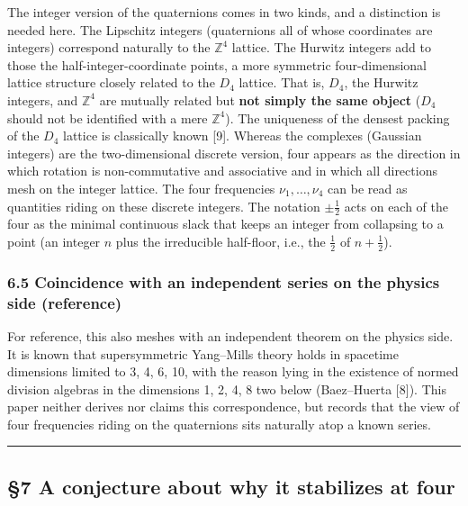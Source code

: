 \documentclass[
]{article}
\begin{document}
The integer version of the quaternions comes in two kinds, and a
distinction is needed here. The Lipschitz integers (quaternions all of
whose coordinates are integers) correspond naturally to the
\(\mathbb{Z}^4\) lattice. The Hurwitz integers add to those the
half-integer-coordinate points, a more symmetric four-dimensional
lattice structure closely related to the \(D_4\) lattice. That is,
\(D_4\), the Hurwitz integers, and \(\mathbb{Z}^4\) are mutually related
but \textbf{not simply the same object} (\(D_4\) should not be
identified with a mere \(\mathbb{Z}^4\)). The uniqueness of the densest
packing of the \(D_4\) lattice is classically known {[}9{]}. Whereas the
complexes (Gaussian integers) are the two-dimensional discrete version,
four appears as the direction in which rotation is non-commutative and
associative and in which all directions mesh on the integer lattice. The
four frequencies \(\nu_1,\dots,\nu_4\) can be read as quantities riding
on these discrete integers. The notation \(\pm\tfrac12\) acts on each of
the four as the minimal continuous slack that keeps an integer from
collapsing to a point (an integer \(n\) plus the irreducible half-floor,
i.e., the \(\tfrac12\) of \(n+\tfrac12\)).

\subsubsection{6.5 Coincidence with an independent series on the physics
side
(reference)}\label{coincidence-with-an-independent-series-on-the-physics-side-reference}

For reference, this also meshes with an independent theorem on the
physics side. It is known that supersymmetric Yang--Mills theory holds
in spacetime dimensions limited to 3, 4, 6, 10, with the reason lying in
the existence of normed division algebras in the dimensions 1, 2, 4, 8
two below (Baez--Huerta {[}8{]}). This paper neither derives nor claims
this correspondence, but records that the view of four frequencies
riding on the quaternions sits naturally atop a known series.

\begin{center}\rule{0.5\linewidth}{0.5pt}\end{center}

\subsection{§7 A conjecture about why it stabilizes at
four}\label{a-conjecture-about-why-it-stabilizes-at-four}
\end{document}
